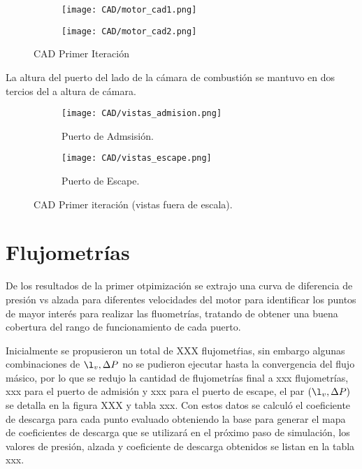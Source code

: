 \begin{figure}
  \centering
    \begin{subfigure}{0.4\textwidth}
        \centering
        \texttt{[image: CAD/motor\_cad1.png]}
    \end{subfigure}
    \hfill
    \begin{subfigure}{0.4\textwidth}
        \centering
        \texttt{[image: CAD/motor\_cad2.png]}
    \end{subfigure}
  \caption{CAD Primer Iteración}\label{fig:motor_cad1}
\end{figure}

La altura del puerto del lado de la cámara de combustión se mantuvo en dos
tercios del a altura de cámara.

\begin{figure}
  \centering
    \begin{subfigure}{0.8\textwidth}
        \centering
        \texttt{[image: CAD/vistas\_admision.png]}
        \caption{Puerto de Admsisión.}
    \end{subfigure}
    \begin{subfigure}{0.8\textwidth}
        \centering
        \texttt{[image: CAD/vistas\_escape.png]}
        \caption{Puerto de Escape.}
    \end{subfigure}
  \caption{CAD Primer iteración (vistas fuera de escala).}\label{fig:motor_cad2}
\end{figure}


\section{Flujometrías}

De los resultados de la primer otpimización se extrajo una curva de diferencia
de presión vs alzada para diferentes velocidades del motor para identificar los
puntos de mayor interés para realizar las fluometrías, tratando de obtener una
buena cobertura del rango de funcionamiento de cada puerto.

Inicialmente se propusieron un total de XXX flujometŕias, sin embargo algunas
combinaciones de $\l_{v}, \Delta P$ no se pudieron ejecutar hasta la
convergencia del flujo másico, por lo que se redujo la cantidad de flujometrías
final a xxx flujometrías, xxx para el puerto de admisión y xxx para el puerto de
escape, el par $(\l_{v}, \Delta P)$ se detalla en la figura XXX y tabla xxx.
%
Con estos datos se calculó el coeficiente de descarga para cada punto evaluado
obteniendo la base para generar el mapa de coeficientes de descarga que se
utilizará en el próximo paso de simulación, los valores de presión, alzada y
coeficiente de descarga obtenidos se listan en la tabla xxx.

